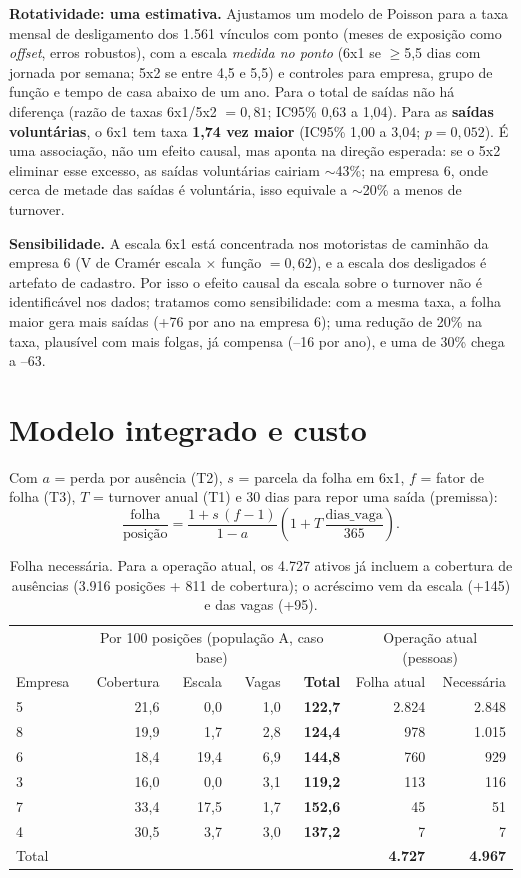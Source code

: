 \documentclass[11pt,a4paper]{article}
\begin{document}
\textbf{Rotatividade: uma estimativa.} Ajustamos um modelo de Poisson para a taxa mensal de desligamento dos 1.561 vínculos com ponto (meses de exposição como \emph{offset}, erros robustos), com a escala \emph{medida no ponto} (6x1 se $\ge$5,5 dias com jornada por semana; 5x2 se entre 4,5 e 5,5) e controles para empresa, grupo de função e tempo de casa abaixo de um ano. Para o total de saídas não há diferença (razão de taxas 6x1/5x2 $=0{,}81$; IC95\% 0,63 a 1,04). Para as \textbf{saídas voluntárias}, o 6x1 tem taxa \textbf{1,74 vez maior} (IC95\% 1,00 a 3,04; $p=0{,}052$). É uma associação, não um efeito causal, mas aponta na direção esperada: se o 5x2 eliminar esse excesso, as saídas voluntárias cairiam $\sim$43\%; na empresa 6, onde cerca de metade das saídas é voluntária, isso equivale a $\sim$20\% a menos de turnover.

\textbf{Sensibilidade.} A escala 6x1 está concentrada nos motoristas de caminhão da empresa 6 (V de Cramér escala $\times$ função $=0{,}62$), e a escala dos desligados é artefato de cadastro. Por isso o efeito causal da escala sobre o turnover não é identificável nos dados; tratamos como sensibilidade: com a mesma taxa, a folha maior gera mais saídas (+76 por ano na empresa 6); uma redução de 20\% na taxa, plausível com mais folgas, já compensa (--16 por ano), e uma de 30\% chega a --63.

\section{Modelo integrado e custo}\label{sec:integrado}
Com $a$ = perda por ausência (T2), $s$ = parcela da folha em 6x1, $f$ = fator de folha (T3), $T$ = turnover anual (T1) e 30 dias para repor uma saída (premissa):
\[ \frac{\text{folha}}{\text{posição}} = \frac{1 + s\,(f-1)}{1-a}\left(1 + T\,\frac{\text{dias\_vaga}}{365}\right). \]

\begin{table}[h]
\centering\small
\begin{tabular}{lrrrr|rr}
\toprule
& \multicolumn{4}{c|}{Por 100 posições (população A, caso base)} & \multicolumn{2}{c}{Operação atual (pessoas)} \\
Empresa & Cobertura & Escala & Vagas & \textbf{Total} & Folha atual & Necessária \\
\midrule
5 & 21,6 & 0,0 & 1,0 & \textbf{122,7} & 2.824 & 2.848 \\
8 & 19,9 & 1,7 & 2,8 & \textbf{124,4} & 978 & 1.015 \\
6 & 18,4 & 19,4 & 6,9 & \textbf{144,8} & 760 & 929 \\
3 & 16,0 & 0,0 & 3,1 & \textbf{119,2} & 113 & 116 \\
7 & 33,4 & 17,5 & 1,7 & \textbf{152,6} & 45 & 51 \\
4 & 30,5 & 3,7 & 3,0 & \textbf{137,2} & 7 & 7 \\
\midrule
Total & & & & & \textbf{4.727} & \textbf{4.967} \\
\bottomrule
\end{tabular}
\caption{Folha necessária. Para a operação atual, os 4.727 ativos já incluem a cobertura de ausências (3.916 posições + 811 de cobertura); o acréscimo vem da escala (+145) e das vagas (+95).}
\end{table}
\end{document}
